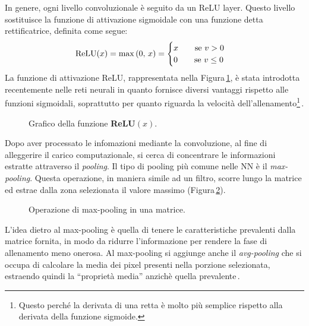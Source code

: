 In genere, ogni livello convoluzionale è seguito da un \acs{ReLU} layer. Questo livello sostituisce la funzione di attivazione sigmoidale con una funzione detta rettificatrice, definita come segue:
% 
\begin{gather*}
    \text{ReLU}(x) = \max{\left(0,\,x\right)} = 
    \begin{cases}
        x \hspace{20px} \text{se } v>0\\
        0 \hspace{20px} \text{se } v\leq0
    \end{cases}
\end{gather*}
% 
\noindent La funzione di attivazione \acs{ReLU}, rappresentata nella Figura\,\ref{fig:relu-function}, è stata introdotta recentemente nelle reti neurali in quanto fornisce diversi vantaggi rispetto alle funzioni sigmoidali, soprattutto per quanto riguarda la velocità dell'allenamento\footnote{Questo perché la derivata di una retta è molto più semplice rispetto alla derivata della funzione sigmoide.}\,\cite{aggarwal2018neural}.
% 
\begin{figure}[!b]
    \centering
    
    \caption[Grafico della funzione \textsl{ReLU}$(x)$.]{Grafico della funzione \textbf{ReLU}$(x)$.}\label{fig:relu-function}
\end{figure}

Dopo aver processato le infomazioni mediante la convoluzione, al fine di alleggerire il carico computazionale, si cerca di concentrare le informazioni estratte attraverso il \textit{pooling}. Il tipo di pooling più comune nelle \acs{NN} è il \textit{max-pooling}. Questa operazione, in maniera simile ad un filtro, scorre lungo la matrice ed estrae dalla zona selezionata il valore massimo (Figura\,\ref{fig:max-pooling-operation}).
% 
\begin{figure}[!t]
    \centering
    
    \caption[Operazione di max-pooling in una matrice.]{Operazione di max-pooling in una matrice.}\label{fig:max-pooling-operation}
\end{figure}
% 
L'idea dietro al max-pooling è quella di tenere le caratteristiche prevalenti dalla matrice fornita, in modo da ridurre l'informazione per rendere la fase di allenamento meno onerosa. Al max-pooling si aggiunge anche il \textit{avg-pooling} che si occupa di calcolare la media dei pixel presenti nella porzione selezionata, estraendo quindi la ``proprietà media'' anzichè quella prevalente\,\cite{aggarwal2018neural, o2015introduction}.

